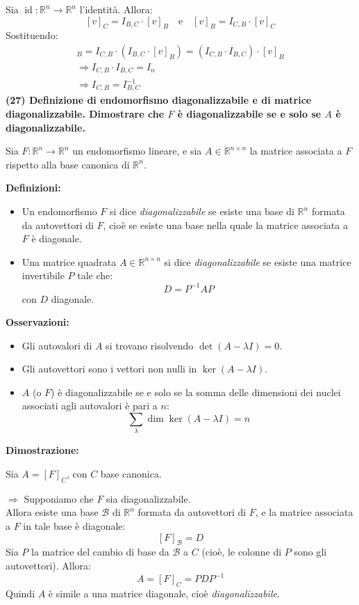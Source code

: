 \documentclass[10pt]{extarticle}
\begin{document}
Sia \( \operatorname{id} : \mathbb{R}^n \to \mathbb{R}^n \) l’identità. Allora:
\[
[v]_C = I_{B,C} \cdot [v]_B \quad \text{e} \quad [v]_B = I_{C,B} \cdot [v]_C
\]
Sostituendo:
\begin{align*}
    [v]_B = I_{C,B} \cdot (I_{B,C} \cdot [v]_B) = (I_{C,B} \cdot I_{B,C}) \cdot [v]_B \\
\Rightarrow I_{C,B} \cdot I_{B,C} = I_n \\\Rightarrow I_{C,B} = I_{B,C}^{-1}
\end{align*}
\textbf{(27) Definizione di endomorfismo diagonalizzabile e di matrice diagonalizzabile. Dimostrare che \( F \) è diagonalizzabile se e solo se \( A \) è diagonalizzabile.}

Sia \( F : \mathbb{R}^n \to \mathbb{R}^n \) un endomorfismo lineare, e sia \( A \in \mathbb{R}^{n \times n} \) la matrice associata a \( F \) rispetto alla base canonica di \( \mathbb{R}^n \).

\textbf{Definizioni:}
\begin{itemize}
    \item Un endomorfismo \( F \) si dice \emph{diagonalizzabile} se esiste una base di \( \mathbb{R}^n \) formata da autovettori di \( F \), cioè se esiste una base nella quale la matrice associata a \( F \) è diagonale.
    
    \item Una matrice quadrata \( A \in \mathbb{R}^{n \times n} \) si dice \emph{diagonalizzabile} se esiste una matrice invertibile \( P \) tale che:
    \[
    D = P^{-1} A P
    \]
    con \( D \) diagonale.
\end{itemize}

\textbf{Osservazioni:}
\begin{itemize}
    \item Gli autovalori di \( A \) si trovano risolvendo \( \det(A - \lambda I) = 0 \).
    \item Gli autovettori sono i vettori non nulli in \( \ker(A - \lambda I) \).
    \item \( A \) (o \( F \)) è diagonalizzabile se e solo se la somma delle dimensioni dei nuclei associati agli autovalori è pari a \( n \):
    \[
    \sum_{\lambda} \dim\ker(A - \lambda I) = n
    \]
\end{itemize}

\textbf{Dimostrazione:}

Sia \( A = [F]_{C} \), con \( C \) base canonica.

\vspace{0.2cm}
\noindent
\underline{\( \Rightarrow \)} Supponiamo che \( F \) sia diagonalizzabile. \\
Allora esiste una base \( \mathcal{B} \) di \( \mathbb{R}^n \) formata da autovettori di \( F \), e la matrice associata a \( F \) in tale base è diagonale:
\[
[F]_{\mathcal{B}} = D
\]
Sia \( P \) la matrice del cambio di base da \( \mathcal{B} \) a \( C \) (cioè, le colonne di \( P \) sono gli autovettori). Allora:
\[
A = [F]_{C} = P D P^{-1}
\]
Quindi \( A \) è simile a una matrice diagonale, cioè \emph{diagonalizzabile}.
\end{document}
